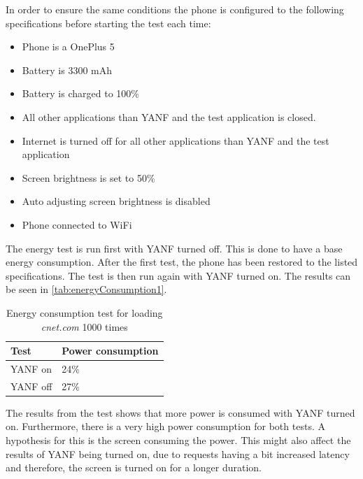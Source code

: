 \documentclass[main.tex]{subfiles}
\begin{document}
In order to ensure the same conditions the phone is configured to the following specifications before starting the test each time:
\begin{itemize}
    \item Phone is a OnePlus 5
    \item Battery is 3300 mAh
    \item Battery is charged to 100\%
    \item All other applications than YANF and the test application is closed. 
    \item Internet is turned off for all other applications than YANF and the test application
    \item Screen brightness is set to 50\%
    \item Auto adjusting screen brightness is disabled
    \item Phone connected to WiFi
\end{itemize}


The energy test is run first with YANF turned off. This is done to have a base energy consumption. After the first test, the phone has been restored to the listed specifications. The test is then run again with YANF turned on. The results can be seen in \autoref{tab:energyConsumption1}.

\begin{table}[H]
    \centering
    \begin{tabular}{|l|l|}\hline
        \textbf{Test}   & \textbf{Power consumption}    \\ \hline
        YANF on         & 24\%                          \\ \hline
        YANF off        & 27\%                          \\ \hline
    \end{tabular}
    \caption{Energy consumption test for  loading \textit{cnet.com} 1000 times}
    \label{tab:energyConsumption1}
\end{table}

The results from the test shows that more power is consumed with YANF turned on. Furthermore, there is a very high power consumption for both tests. A hypothesis for this is the screen consuming the power. This might also affect the results of YANF being turned on, due to requests having a bit increased latency and therefore, the screen is turned on for a longer duration.
\end{document}
